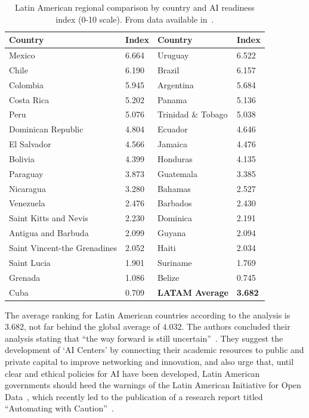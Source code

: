 \documentclass[conference]{IEEEtran}
\begin{document}
\begin{table}[!t]
\caption{Latin American regional comparison by country and AI readiness index (0-10 scale). From data available in~\cite{miller2019government}.}
\label{tbl:ai-index}
\centering
\begin{tabular}{|l|l||l|l|}
\hline
\textbf{Country} & \textbf{Index} & \textbf{Country} & \textbf{Index} \\
\hline
Mexico & 6.664 & Uruguay & 6.522 \\
Chile & 6.190 & Brazil & 6.157 \\  
Colombia & 5.945 & Argentina & 5.684 \\
Costa Rica & 5.202 & Panama & 5.136 \\ 
Peru & 5.076 & Trinidad \& Tobago & 5.038 \\
Dominican Republic & 4.804 & Ecuador & 4.646 \\
El Salvador & 4.566 & Jamaica & 4.476 \\     
Bolivia & 4.399 & Honduras & 4.135 \\ \hline 
Paraguay & 3.873 & Guatemala & 3.385 \\
Nicaragua & 3.280 & Bahamas & 2.527 \\ 
Venezuela & 2.476 & Barbados & 2.430 \\
Saint Kitts and Nevis & 2.230 & Dominica & 2.191 \\
Antigua and Barbuda & 2.099 & Guyana & 2.094 \\
Saint Vincent-the Grenadines & 2.052 & Haiti & 2.034 \\
Saint Lucia & 1.901 & Suriname & 1.769 \\    
Grenada & 1.086 & Belize & 0.745 \\
Cuba & 0.709 & \textbf{LATAM Average} & \textbf{3.682} \\
\hline
\end{tabular}
\end{table}

The average ranking for Latin American countries according to the analysis is $3.682$, not far behind the global average of $4.032$. The authors concluded their analysis stating that ``the way forward is still uncertain''~\cite{miller2019government}. They suggest the development of `AI Centers' by connecting their academic resources to public and private capital to improve networking and innovation, and also urge that, until clear and ethical policies for AI have been developed, Latin American governments should heed the warnings of the Latin American Initiative for Open Data~\cite{davies2019the}, which recently led to the publication of a research report titled ``Automating with Caution''~\cite{scrollini2018automatizar}.
\end{document}
